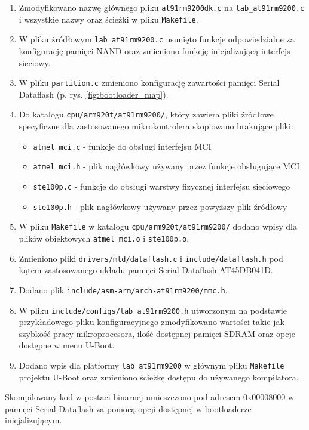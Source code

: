 \documentclass[a4paper,12pt]{book}
\begin{document}
				\begin{enumerate}
					\item Zmodyfikowano nazwę głównego pliku \texttt{at91rm9200dk.c} na \texttt{lab\_at91rm9200.c} i wszystkie nazwy oraz ścieżki w pliku \texttt{Makefile}.
					\item W pliku źródłowym \texttt{lab\_at91rm9200.c} usunięto funkcje odpowiedzialne za konfigurację pamięci NAND oraz zmieniono funkcję inicjalizującą interfejs sieciowy.
					\item W pliku \texttt{partition.c} zmieniono konfigurację zawartości pamięci Serial Dataflash (p. rys. \ref{fig:bootloader_map}).
					\item Do katalogu \texttt{cpu/arm920t/at91rm9200/}, który zawiera pliki źródłowe specyficzne dla zastosowanego mikrokontrolera skopiowano brakujące pliki:
						\begin{itemize}
							\item \texttt{atmel\_mci.c} - funkcje do obsługi interfejsu MCI
							\item \texttt{atmel\_mci.h} - plik nagłówkowy używany przez funkcje obsługujące MCI
							\item \texttt{ste100p.c} - funkcje do obsługi warstwy fizycznej interfejsu sieciowego
							\item \texttt{ste100p.h} - plik nagłówkowy używany przez powyższy plik źródłowy
						\end{itemize}
					\item W pliku \texttt{Makefile} w katalogu \texttt{cpu/arm920t/at91rm9200/} dodano wpisy dla plików obiektowych \texttt{atmel\_mci.o} i \texttt{ste100p.o}.
					\item Zmieniono pliki \texttt{drivers/mtd/dataflash.c} i \texttt{include/dataflash.h} pod kątem zastosowanego układu pamięci Serial Dataflash AT45DB041D.
					\item Dodano plik \texttt{include/asm-arm/arch-at91rm9200/mmc.h}.
					\item W pliku \texttt{include/configs/lab\_at91rm9200.h} utworzonym na podstawie przykładowego pliku konfiguracyjnego zmodyfikowano wartości takie jak szybkość pracy mikroprocesora, ilość dostępnej pamięci SDRAM oraz opcje dostępne w menu U-Boot.
					\item Dodano wpis dla platformy \texttt{lab\_at91rm9200} w głównym pliku \texttt{Makefile} projektu U-Boot oraz zmieniono ścieżkę dostępu do używanego kompilatora.
				\end{enumerate}
				Skompilowany kod w postaci binarnej umieszczono pod adresem 0x00008000 w pamięci Serial Dataflash za pomocą opcji dostępnej w bootloaderze inicjalizującym.\\
\end{document}
